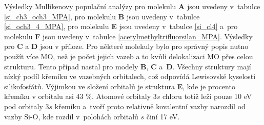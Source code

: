 \documentclass[
digital, %
table,   %
nolof,     %
nolot,     %
oneside,
]{fithesis3}
\begin{document}
\begin{figure}
\begin{center}
\label{prehled_nbo_si_ch3_oac_3}
\end{center}
\end{figure}

Výsledky Mullikenovy populační analýzy pro molekulu \textbf{A} jsou uvedeny v~tabulce \ref{si_ch3_och3_MPA}, pro molekulu \textbf{B} jsou uvedeny v~tabulce \ref{si_och3_4_MPA}, pro molekulu \textbf{E} jsou uvedeny v~tabulce \ref{si_cl4} a~pro molekulu \textbf{F} jsou uvedeny v~tabulce \ref{acetylmethyltrifluorsilan_MPA}. Výsledky pro \textbf{C} a \textbf{D} jsou v příloze. Pro některé molekuly bylo pro správný popis nutno použít více MO, než je počet jejich vazeb a to kvůli delokalizaci MO přes celou strukturu. Tento případ nastal pro modely \textbf{B}, \textbf{C} a~\textbf{D}. Všechny struktury mají nízký podíl křemíku ve vazebných orbitalech, což odpovídá Lewisovské kyselosti silikofosfátů. Výjimkou ve složení orbitalů je struktura \textbf{E}, kde je procento křemíku v orbitalu asi 43 \%. Atomové orbitaly $3s$ chloru totiž leží pouze 10 eV pod orbitaly $3s$ křemíku a~tvoří proto relativně kovalentní vazby narozdíl od vazby Si-O, kde rozdíl v~polohách orbitalů $s$ činí 17 eV.
\end{document}
